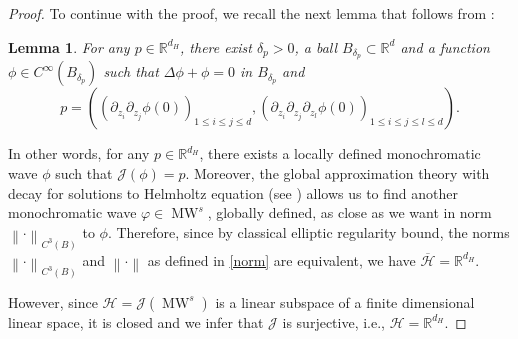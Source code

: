 \documentclass{amsart}
\newtheorem{lemma}[theorem]{Lemma}
\theoremstyle{definition}
\theoremstyle{remark}
\def\RR{\mathbb{R}}
\renewcommand\leq\leqslant
\numberwithin{equation}{section}
\theoremstyle{definition}
\theoremstyle{remark}
\def\RR{\mathbb{R}}
\DeclareMathOperator\MW{MW}
\begin{document}
\begin{proof}
	To continue with the proof, we recall the next lemma that follows from \cite[Theorem 3.2]{Damon}:\begin{lemma}\label{Damon}
		For any $p\in \mathbb{R}^{d_H}$, there exist $\delta_p>0$, a ball $B_{\delta_p}\subset\mathbb{R}^d$ and a function $\phi\in C^\infty\left(B_{\delta_p}\right)$ such that $\Delta \phi+\phi=0$ in $B_{\delta_p}$ and \begin{equation}
			p=\left(\left(\partial_{z_i}\partial_{z_j}\phi(0)\right)_{1\leq i\leq j\leq d},\left(\partial_{z_i}\partial_{z_j}\partial_{z_l}\phi(0)\right)_{1\leq i\leq j\leq l\leq d}\right).
		\end{equation}
	\end{lemma}In other words, for any $p\in\RR^{d_H}$, there exists a locally defined monochromatic wave $\phi$ such that $\mathcal{J}(\phi)=p$. Moreover, the global approximation theory with decay for solutions to Helmholtz equation (see \cite[Chapter 1]{Mangeles}) allows us to find another monochromatic wave $\varphi\in\MW^s$, globally defined, as close as we want in norm $\left\|\cdot\right\|_{C^3\left(B\right)}$ to $\phi$. Therefore, since by classical elliptic regularity bound, the norms $\left\|\cdot\right\|_{C^3\left(B\right)}$ and $\left\|\cdot\right\|$ as defined in \eqref{norm} are equivalent, we have $\overline{\mathcal{H}}=\mathbb{R}^{d_H}$.
	
	 However, since $\mathcal{H}=\mathcal{J}\left(\MW^s\right)$ is a linear subspace of a finite dimensional linear space, it is closed and we infer that $\mathcal{J}$ is surjective, i.e., $\mathcal H=\mathbb R^{d_H}$.
	

\end{proof}
\end{document}
